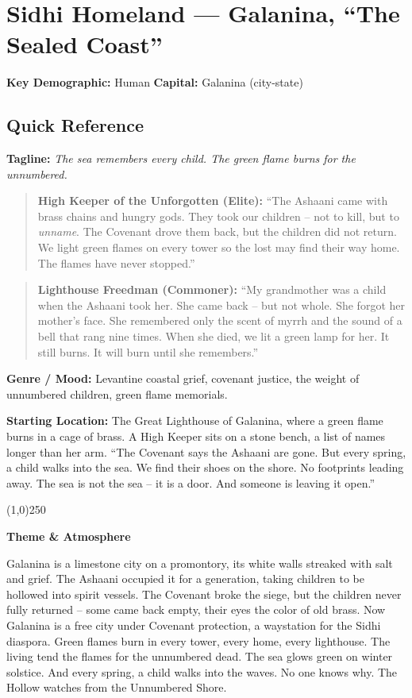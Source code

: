 \section{Sidhi Homeland --- Galanina, ``The Sealed Coast''}
\label{chap:galanina}

\textbf{Key Demographic: } Human
\textbf{Capital: } Galanina (city-state)

\subsection*{Quick Reference}
\textbf{Tagline:} \textit{The sea remembers every child. The green flame burns for the unnumbered.}

\begin{quote}
  \textbf{High Keeper of the Unforgotten (Elite):}  
  ``The Ashaani came with brass chains and hungry gods. They took our children -- not to kill, but to \textit{unname}. The Covenant drove them back, but the children did not return. We light green flames on every tower so the lost may find their way home. The flames have never stopped.''
\end{quote}

\begin{quote}
  \textbf{Lighthouse Freedman (Commoner):}  
  ``My grandmother was a child when the Ashaani took her. She came back -- but not whole. She forgot her mother's face. She remembered only the scent of myrrh and the sound of a bell that rang nine times. When she died, we lit a green lamp for her. It still burns. It will burn until she remembers.''
\end{quote}

\textbf{Genre / Mood:} Levantine coastal grief, covenant justice, the weight of unnumbered children, green flame memorials.

\textbf{Starting Location:} The Great Lighthouse of Galanina, where a green flame burns in a cage of brass. A High Keeper sits on a stone bench, a list of names longer than her arm. ``The Covenant says the Ashaani are gone. But every spring, a child walks into the sea. We find their shoes on the shore. No footprints leading away. The sea is not the sea -- it is a door. And someone is leaving it open.''

\vspace{2mm}
\begin{center}
\line(1,0){250}
\end{center}
\textbf{Theme \& Atmosphere}

Galanina is a limestone city on a promontory, its white walls streaked with salt and grief. The Ashaani occupied it for a generation, taking children to be hollowed into spirit vessels. The Covenant broke the siege, but the children never fully returned -- some came back empty, their eyes the color of old brass. Now Galanina is a free city under Covenant protection, a waystation for the Sidhi diaspora. Green flames burn in every tower, every home, every lighthouse. The living tend the flames for the unnumbered dead. The sea glows green on winter solstice. And every spring, a child walks into the waves. No one knows why. The Hollow watches from the Unnumbered Shore.

